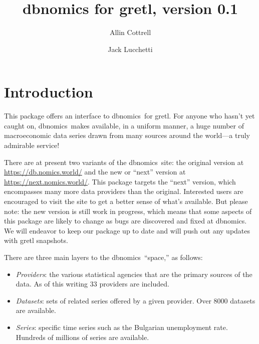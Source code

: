 \documentclass{article}
\begin{document}
\setlength{\parindent}{0pt}
\setlength{\parskip}{1ex}
\setcounter{secnumdepth}{1}


\newenvironment{funcdoc}
{\noindent\hrulefill\\[-10pt]}
{\medskip}

\newcommand{\argname}[1]{\textsl{#1}}
\newcommand{\DB}{\textsf{dbnomics}}
  
\title{dbnomics for gretl, version 0.1}
\author{Allin Cottrell \and Jack Lucchetti}
\maketitle

\section{Introduction}

This package offers an interface to \DB\ for gretl. For
anyone who hasn't yet caught on, \DB\  makes available, in
a uniform manner, a huge number of macroeconomic data series drawn
from many sources around the world---a truly admirable service!

There are at present two variants of the \DB\  site: the
original version at \url{https://db.nomics.world/} and the new or
``next'' version at \url{https://next.nomics.world/}. This package
targets the ``next'' version, which encompasses many more data
providers than the original. Interested users are encouraged to visit
the site to get a better sense of what's available.  But please note:
the new version is still work in progress, which means that some
aspects of this package are likely to change as bugs are discovered
and fixed at \DB. We will endeavor to keep our package
up to date and will push out any updates with gretl snapshots.

There are three main layers to the \DB\ ``space,'' as
follows:
\begin{itemize}
\item \textit{Providers}: the various statistical agencies that are
  the primary sources of the data. As of this writing 33 providers
  are included.
\item \textit{Datasets}: sets of related series offered by a given
  provider. Over 8000 datasets are available.
\item \textit{Series}: specific time series such as the Bulgarian
  unemployment rate. Hundreds of millions of series are available.
\end{itemize}
\end{document}
